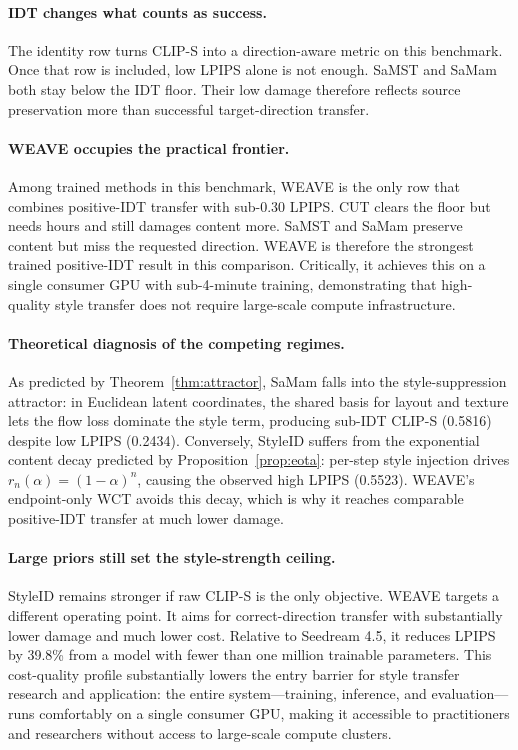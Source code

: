 \documentclass[letterpaper]{article}
\begin{document}
\paragraph{IDT changes what counts as success.}
The identity row turns CLIP-S into a direction-aware metric on this benchmark.
Once that row is included, low LPIPS alone is not enough.
SaMST and SaMam both stay below the IDT floor.
Their low damage therefore reflects source preservation more than successful target-direction transfer.

\paragraph{WEAVE occupies the practical frontier.}
Among trained methods in this benchmark, WEAVE is the only row that combines positive-IDT transfer with sub-0.30 LPIPS.
CUT clears the floor but needs hours and still damages content more.
SaMST and SaMam preserve content but miss the requested direction.
WEAVE is therefore the strongest trained positive-IDT result in this comparison.
Critically, it achieves this on a single consumer GPU with sub-4-minute training, demonstrating that high-quality style transfer does not require large-scale compute infrastructure.

\paragraph{Theoretical diagnosis of the competing regimes.}
As predicted by Theorem~\ref{thm:attractor}, SaMam falls into the style-suppression attractor: in Euclidean latent coordinates, the shared basis for layout and texture lets the flow loss dominate the style term, producing sub-IDT CLIP-S (0.5816) despite low LPIPS (0.2434).
Conversely, StyleID suffers from the exponential content decay predicted by Proposition~\ref{prop:eota}: per-step style injection drives $r_n(\alpha)=(1-\alpha)^n$, causing the observed high LPIPS (0.5523).
WEAVE's endpoint-only WCT avoids this decay, which is why it reaches comparable positive-IDT transfer at much lower damage.

\paragraph{Large priors still set the style-strength ceiling.}
StyleID remains stronger if raw CLIP-S is the only objective.
WEAVE targets a different operating point.
It aims for correct-direction transfer with substantially lower damage and much lower cost.
Relative to Seedream 4.5, it reduces LPIPS by 39.8\% from a model with fewer than one million trainable parameters.
This cost-quality profile substantially lowers the entry barrier for style transfer research and application: the entire system---training, inference, and evaluation---runs comfortably on a single consumer GPU, making it accessible to practitioners and researchers without access to large-scale compute clusters.
\end{document}
